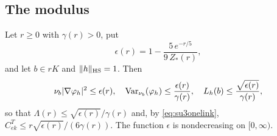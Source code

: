 \subsection{The modulus}

\begin{lemma}\label{lem:su3modulus}
Let $r\ge0$ with $\gamma(r)>0$, put
\[
\epsilon(r)=1-\frac{5\,e^{-r/5}}{9\,Z_*(r)},
\]
and let $b\in rK$ and $\|h\|_{\rm HS}=1$. Then
\[
\nu_b|\nabla\varphi_h|^2\le\epsilon(r),\quad\operatorname{Var}_{\nu_b}(\varphi_h)\le
\frac{\epsilon(r)}{\gamma(r)},\quad L_h(b)\le\frac{\sqrt{\epsilon(r)}}
{\gamma(r)},
\]
so that $\Lambda(r)\le\sqrt{\epsilon(r)}/\gamma(r)$ and, by
\eqref{eq:su3onelink}, $C^T_{ek}\le r\sqrt{\epsilon(r)}/(6\gamma(r))$. The
function $\epsilon$ is nondecreasing on $[0,\infty)$.
\end{lemma}

